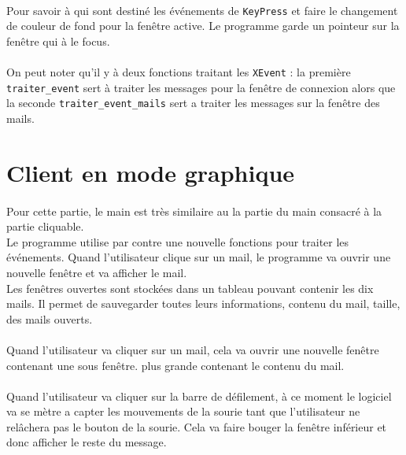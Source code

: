 \documentclass[a4paper, titlepage, oneside, 12pt]{article}%
\begin{document}
\paragraph{}
Pour savoir à qui sont destiné les événements de \texttt{KeyPress} et faire le changement de couleur de fond pour la fenêtre active. Le programme garde un pointeur sur la fenêtre qui à le focus.

\paragraph{}
On peut noter qu'il y à deux fonctions traitant les \texttt{XEvent} : la première \texttt{traiter\_event} sert à traiter les messages pour la fenêtre de connexion alors que la seconde \texttt{traiter\_event\_mails} sert a traiter les messages sur la fenêtre des mails.

\section{Client en mode graphique}
\paragraph{}
Pour cette partie, le main est très similaire au la partie du main consacré à la partie cliquable.\\
Le programme utilise par contre une nouvelle fonctions pour traiter les événements. Quand l'utilisateur clique sur un mail, le programme va ouvrir une nouvelle fenêtre et va afficher le mail.\\
Les fenêtres ouvertes sont stockées dans un tableau pouvant contenir les dix mails. Il permet de sauvegarder toutes leurs informations, contenu du mail, taille, des mails ouverts.

\paragraph{}
Quand l'utilisateur va cliquer sur un mail, cela va ouvrir une nouvelle fenêtre contenant une sous fenêtre. plus grande contenant le contenu du mail.

\paragraph{}
Quand l'utilisateur va cliquer sur la barre de défilement, à ce moment le logiciel va se mètre a capter les mouvements de la sourie tant que l'utilisateur ne relâchera pas le bouton de la sourie. Cela va faire bouger la fenêtre inférieur et donc afficher le reste du message. \\
\end{document}
